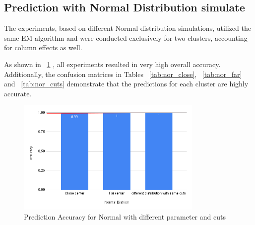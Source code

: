 \documentclass{article}
\begin{document}
\subsection{Prediction with Normal Distribution simulate}

The experiments, based on different Normal distribution simulations, 
utilized the same EM algorithm and were conducted exclusively for two clusters, 
accounting for column effects as well.

As shown in ~\ref*{fig:dist_acc} , all experiments resulted in very high overall accuracy. 
Additionally, the confusion matrices in Tables ~\ref*{tab:nor_close}, ~\ref*{tab:nor_far} and  ~\ref*{tab:nor_cuts}
demonstrate that the predictions for each cluster are highly accurate.

\begin{figure}[h]
  \centering
  \includegraphics[width=0.8\textwidth]{images/experiments/norm_dist.png}
  \caption{Prediction Accuracy for Normal with different parameter and cuts}
  \label{fig:dist_acc}
\end{figure}
\end{document}
